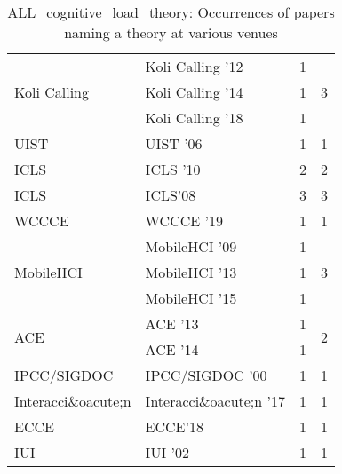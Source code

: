 \begin{table*}[t]
\begin{tabular}{llrr}
\multirow{3}{*}{Koli Calling } & Koli Calling '12 & 1 & \multirow{3}{*}{3}\\
& Koli Calling '14 & 1 &\\
& Koli Calling '18 & 1 &\\
\multirow{1}{*}{UIST } & UIST '06 & 1 & \multirow{1}{*}{1}\\
\multirow{1}{*}{ICLS } & ICLS '10 & 2 & \multirow{1}{*}{2}\\
\multirow{1}{*}{ICLS} & ICLS'08 & 3 & \multirow{1}{*}{3}\\
\multirow{1}{*}{WCCCE } & WCCCE '19 & 1 & \multirow{1}{*}{1}\\
\multirow{3}{*}{MobileHCI } & MobileHCI '09 & 1 & \multirow{3}{*}{3}\\
& MobileHCI '13 & 1 &\\
& MobileHCI '15 & 1 &\\
\multirow{2}{*}{ACE } & ACE '13 & 1 & \multirow{2}{*}{2}\\
& ACE '14 & 1 &\\
\multirow{1}{*}{IPCC/SIGDOC } & IPCC/SIGDOC '00 & 1 & \multirow{1}{*}{1}\\
\multirow{1}{*}{Interacci\&oacute;n } & Interacci\&oacute;n '17 & 1 & \multirow{1}{*}{1}\\
\multirow{1}{*}{ECCE} & ECCE'18 & 1 & \multirow{1}{*}{1}\\
\multirow{1}{*}{IUI } & IUI '02 & 1 & \multirow{1}{*}{1}\\
\end{tabular}
\caption{ALL\_cognitive\_load\_theory: Occurrences of papers naming a theory at various venues}
\end{table*}